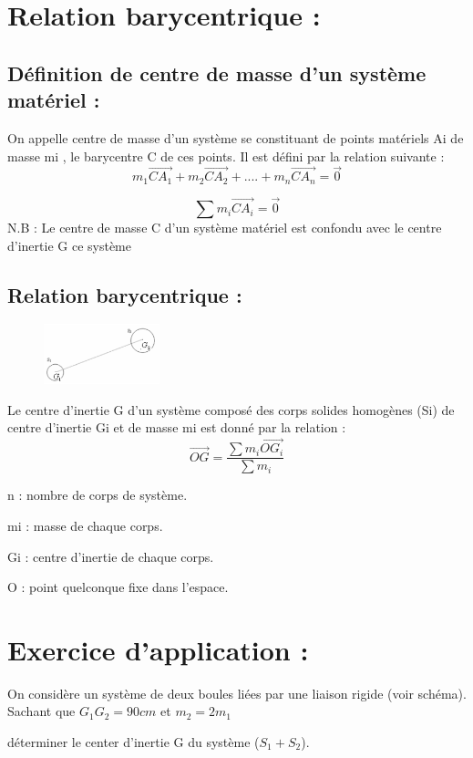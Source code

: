 \documentclass[12pt]{article}
\begin{document}
\section{Relation barycentrique : }
\subsection{Définition de centre de masse d’un système matériel : }

On appelle centre de masse d’un système se constituant de points matériels Ai de masse mi , le barycentre C de ces points. Il est défini par la relation suivante :
$$m_1\overrightarrow{CA_1} + m_2\overrightarrow{CA_2} + ....+ m_n\overrightarrow{CA_n} = \overrightarrow{0}$$

$$\sum m_i\overrightarrow{CA_i} = \overrightarrow{0}$$
N.B : Le centre de masse C d’un système matériel est confondu avec le centre d’inertie G ce système


\subsection{Relation barycentrique : }
\begin{figure}

\includegraphics[width=0.3\textwidth]{./img/img04.png}
\end{figure}
Le centre d’inertie G d’un système composé des corps solides homogènes (Si) de centre d’inertie Gi et de masse
mi est donné par la relation : 
$$\overrightarrow{OG} = \frac{\sum m_i\overrightarrow{OG_i}}{\sum m_i}$$

n : nombre de corps de système.

mi : masse de chaque corps.

Gi : centre d’inertie de chaque corps.

O : point quelconque fixe dans l’espace.

\section{ Exercice d'application : }

On considère un système de deux boules liées par une liaison rigide (voir schéma).
Sachant que $G_1G_2 = 90cm $ et $m_2 = 2 m_1$

déterminer le center d'inertie G du système ($S_1 + S_2$).
\end{document}
